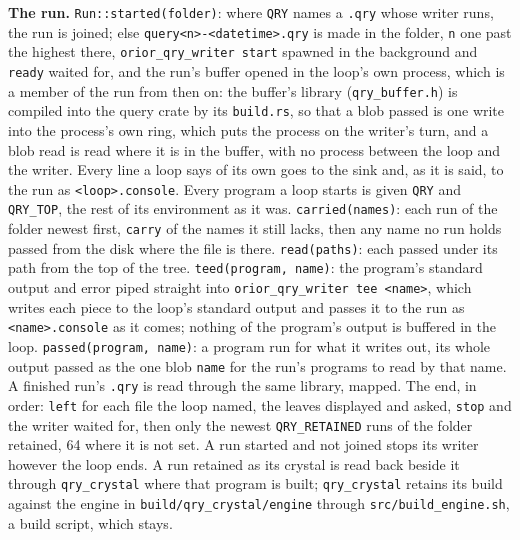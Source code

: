 \textbf{The run.} \texttt{Run::started(folder)}: where \texttt{QRY} names a \texttt{.\allowbreak{}qry} whose writer runs, the run is joined; else \texttt{query<n>-\allowbreak{}<datetime>.\allowbreak{}qry} is made in the folder, \texttt{n} one past the highest there, \texttt{orior\_\allowbreak{}qry\_\allowbreak{}writer start} spawned in the background and \texttt{ready} waited for, and the run's buffer opened in the loop's own process, which is a member of the run from then on: the buffer's library (\texttt{qry\_\allowbreak{}buffer.\allowbreak{}h}) is compiled into the query crate by its \texttt{build.\allowbreak{}rs}, so that a blob passed is one write into the process's own ring, which puts the process on the writer's turn, and a blob read is read where it is in the buffer, with no process between the loop and the writer. Every line a loop says of its own goes to the sink and, as it is said, to the run as \texttt{<loop>.\allowbreak{}console}. Every program a loop starts is given \texttt{QRY} and \texttt{QRY\_\allowbreak{}TOP}, the rest of its environment as it was. \texttt{carried(names)}: each run of the folder newest first, \texttt{carry} of the names it still lacks, then any name no run holds passed from the disk where the file is there. \texttt{read(paths)}: each passed under its path from the top of the tree. \texttt{teed(program, name)}: the program's standard output and error piped straight into \texttt{orior\_\allowbreak{}qry\_\allowbreak{}writer tee <name>}, which writes each piece to the loop's standard output and passes it to the run as \texttt{<name>.\allowbreak{}console} as it comes; nothing of the program's output is buffered in the loop. \texttt{passed(program, name)}: a program run for what it writes out, its whole output passed as the one blob \texttt{name} for the run's programs to read by that name. A finished run's \texttt{.\allowbreak{}qry} is read through the same library, mapped. The end, in order: \texttt{left} for each file the loop named, the leaves displayed and asked, \texttt{stop} and the writer waited for, then only the newest \texttt{QRY\_\allowbreak{}RETAINED} runs of the folder retained, 64 where it is not set. A run started and not joined stops its writer however the loop ends. A run retained as its crystal is read back beside it through \texttt{qry\_\allowbreak{}crystal} where that program is built; \texttt{qry\_\allowbreak{}crystal} retains its build against the engine in \texttt{build/\allowbreak{}qry\_\allowbreak{}crystal/\allowbreak{}engine} through \texttt{src/\allowbreak{}build\_\allowbreak{}engine.\allowbreak{}sh}, a build script, which stays.

